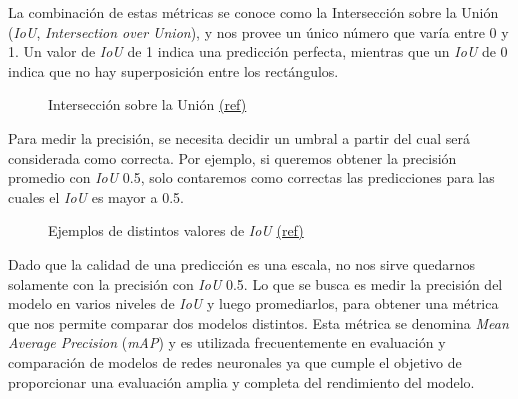 \documentclass[a4paper]{article}
\begin{document}
La combinación de estas métricas se conoce como la Intersección sobre la Unión (\textit{IoU}, \textit{Intersection over Union}), y nos provee un único número que varía entre 0 y 1. Un valor de \textit{IoU} de 1 indica una predicción perfecta, mientras que un \textit{IoU} de 0 indica que no hay superposición entre los rectángulos.

\begin{figure}[H]
\caption{Intersección sobre la Unión \scriptsize{\href{https://pyimagesearch.com/2016/11/07/intersection-over-union-iou-for-object-detection/}{(ref)}}}
\end{figure}

Para medir la precisión, se necesita decidir un umbral a partir del cual será considerada como correcta. Por ejemplo, si queremos obtener la precisión promedio con \textit{IoU} 0.5, solo contaremos como correctas las predicciones para las cuales el \textit{IoU} es mayor a 0.5.

\begin{figure}[H]
\caption{Ejemplos de distintos valores de \textit{IoU} \scriptsize{\href{https://pyimagesearch.com/2016/11/07/intersection-over-union-iou-for-object-detection/}{(ref)}}}
\end{figure}

Dado que la calidad de una predicción es una escala, no nos sirve quedarnos solamente con la precisión con \textit{IoU} 0.5. Lo que se busca es medir la precisión del modelo en varios niveles de \textit{IoU} y luego promediarlos, para obtener una métrica que nos permite comparar dos modelos distintos. Esta métrica se denomina \textit{Mean Average Precision} (\textit{mAP}) y es utilizada frecuentemente en evaluación y comparación de modelos de redes neuronales ya que cumple el objetivo de proporcionar una evaluación amplia y completa del rendimiento del modelo.
\end{document}
